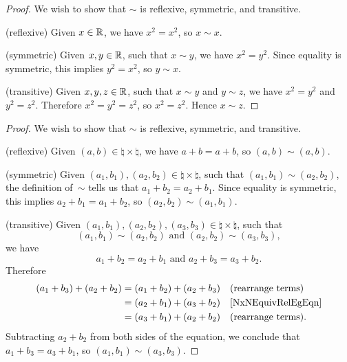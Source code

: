 \documentclass[../MATH-2000-Notes.tex]{subfiles}
\begin{document}
\begin{Answers}
    \item
    \begin{proof}
        We wish to show that $\sim$ is reflexive, symmetric, and transitive.

        (reflexive) Given $x \in \mathbb{R} $, we have $x^2 = x^2$, so $x \sim x$.

        (symmetric) Given $x,y \in \mathbb{R}$, such that $x \sim y$, we have $x^2 = y^2$. Since equality is symmetric, this implies $y^2 = x^2$, so $y \sim x$.

        (transitive) Given $x,y,z \in \mathbb{R}$, such that $x \sim y$ and $y \sim z$, we have $x^2 = y^2$ and $y^2 = z^2$. Therefore $x^2 = y^2 = z^2$, so $x^2 = z^2$. Hence $x \sim z$.
    \end{proof}
    \item
    \begin{proof}
        We wish to show that $\sim$ is reflexive, symmetric, and transitive.

        (reflexive) Given $(a,b) \in \natural \times \natural$, we have $a + b = a + b$, so $(a,b) \sim (a,b)$.

        (symmetric) Given $(a_1,b_1) , (a_2,b_2) \in \natural \times \natural$, such that $(a_1,b_1) \sim (a_2,b_2)$, the definition of~$\sim$ tells us that $a_1 +b_2 = a_2 + b_1$. Since equality is symmetric, this implies $a_2 + b_1 = a_1 + b_2$, so $(a_2,b_2) \sim (a_1,b_1)$.

        (transitive) Given $(a_1,b_1) , (a_2,b_2) , (a_3,b_3) \in \natural \times \natural$, such that
        $$ \text{$(a_1,b_1) \sim (a_2,b_2)$ \ and \  $(a_2,b_2) \sim (a_3,b_3)$} ,$$
        we have
        \begin{equation} \label{NxNEquivRelEgEqn}
            \text{$a_1 + b_2 = a_2 + b_1$ and $a_2 + b_3 = a_3 + b_2$.}
        \end{equation}
        Therefore
        \begin{align*}
            (a_1 + b_3) + (a_2 + b_2)
             & = (a_1 + b_2) + (a_2 + b_3) &  & \text{(rearrange terms)}
            \\&= (a_2 + b_1) + (a_3 + b_2) && \text{\ref{NxNEquivRelEgEqn}}
            \\&= (a_3 + b_1) + (a_2 + b_2) && \text{(rearrange terms)} .
        \end{align*}
        Subtracting $a_2 + b_2$ from both sides of the equation, we conclude that $a_1 + b_3 = a_3 + b_1$,
        so $(a_1,b_1) \sim (a_3,b_3)$.
    \end{proof}
\end{Answers}
\end{document}
